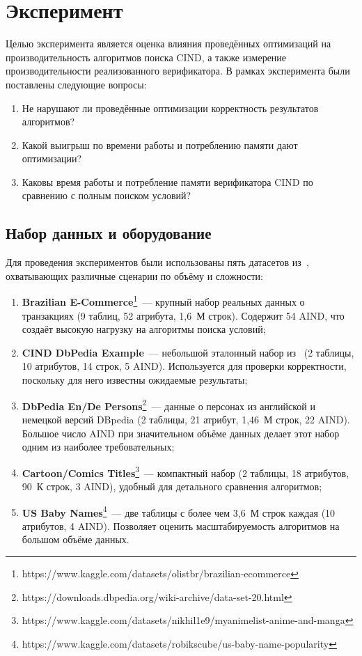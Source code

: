 
\section{Эксперимент}
Целью эксперимента является оценка влияния проведённых оптимизаций на производительность алгоритмов поиска CIND, а также измерение производительности реализованного верификатора. В рамках эксперимента были поставлены следующие вопросы:

\begin{enumerate}
    \item Не нарушают ли проведённые оптимизации корректность результатов алгоритмов?
    \item Какой выигрыш по времени работы и потреблению памяти дают оптимизации?
    \item Каковы время работы и потребление памяти верификатора CIND по сравнению с полным поиском условий?
\end{enumerate}

\subsection{Набор данных и оборудование}

Для проведения экспериментов были использованы пять датасетов из~\cite{abrosimov2025cinderella}, охватывающих различные сценарии по объёму и сложности:

\begin{enumerate}
    \item \textbf{Brazilian E-Commerce}\footnote{https://www.kaggle.com/datasets/olistbr/brazilian-ecommerce}~--- крупный набор реальных данных о транзакциях (9 таблиц, 52 атрибута, 1{,}6~М строк). Содержит 54 AIND, что создаёт высокую нагрузку на алгоритмы поиска условий;

    \item \textbf{CIND DbPedia Example}~--- небольшой эталонный набор из~\cite{brink2012cind} (2 таблицы, 10 атрибутов, 14 строк, 5 AIND). Используется для проверки корректности, поскольку для него известны ожидаемые результаты;

    \item \textbf{DbPedia En/De Persons}\footnote{https://downloads.dbpedia.org/wiki-archive/data-set-20.html}~--- данные о персонах из английской и немецкой версий DBpedia (2 таблицы, 21 атрибут, 1{,}46~М строк, 22 AIND). Большое число AIND при значительном объёме данных делает этот набор одним из наиболее требовательных;

    \item \textbf{Cartoon/Comics Titles}\footnote{https://www.kaggle.com/datasets/nikhil1e9/myanimelist-anime-and-manga}~--- компактный набор (2 таблицы, 18 атрибутов, 90~К строк, 3 AIND), удобный для детального сравнения алгоритмов;

    \item \textbf{US Baby Names}\footnote{https://www.kaggle.com/datasets/robikscube/us-baby-name-popularity}~--- две таблицы с более чем 3{,}6~М строк каждая (10 атрибутов, 4 AIND). Позволяет оценить масштабируемость алгоритмов на большом объёме данных.
\end{enumerate}

